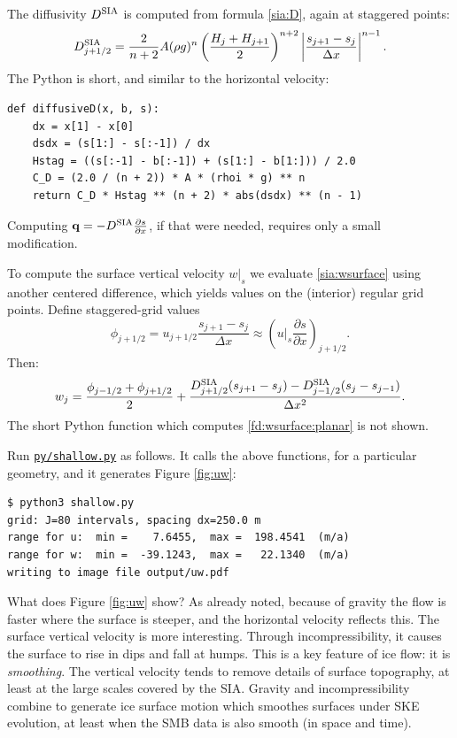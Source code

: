 \documentclass[letterpaper,final,12pt,reqno]{amsart}
\newcommand{\bq}{\mathbf{q}}
\newcommand{\Dsia}{D^{\text{\textrm{SIA}}}}
\begin{document}
The diffusivity $\Dsia$ is computed from formula \eqref{sia:D}, again at staggered points:
\begin{equation}
\Dsia_{j+1/2} = \frac{2}{n+2} A (\rho g)^n \left(\frac{H_j + H_{j+1}}{2}\right)^{n+2} \left|\frac{s_{j+1}-s_j}{\Delta x}\right|^{n-1}. \label{fd:Dsia:planar}
\end{equation}
The Python is short, and similar to the horizontal velocity:
\begin{lstlisting}[language=PythonPlus, xleftmargin=4mm]
def diffusiveD(x, b, s):
    dx = x[1] - x[0]
    dsdx = (s[1:] - s[:-1]) / dx
    Hstag = ((s[:-1] - b[:-1]) + (s[1:] - b[1:])) / 2.0
    C_D = (2.0 / (n + 2)) * A * (rhoi * g) ** n
    return C_D * Hstag ** (n + 2) * abs(dsdx) ** (n - 1)
\end{lstlisting}
Computing $\bq=-\Dsia \frac{\partial s}{\partial x}$, if that were needed, requires only a small modification.

To compute the surface vertical velocity $w|_s$ we evaluate \eqref{sia:wsurface} using another centered difference, which yields values on the (interior) regular grid points.  Define staggered-grid values
	$$\phi_{j+1/2} = u_{j+1/2} \frac{s_{j+1}-s_j}{\Delta x} \approx \left(u|_s \frac{\partial s}{\partial x}\right)_{j+1/2}.$$
Then:
\begin{equation}
w_j = \frac{\phi_{j-1/2} + \phi_{j+1/2}}{2} + \frac{\Dsia_{j+1/2} (s_{j+1}-s_j) - \Dsia_{j-1/2} (s_{j}-s_{j-1})}{\Delta x^2}. \label{fd:wsurface:planar}
\end{equation}
The short Python function which computes \eqref{fd:wsurface:planar} is not shown.

Run \href{https://github.com/bueler/mccarthy/blob/master/py/shallow.py}{\texttt{py/shallow.py}} as follows.  It calls the above functions, for a particular geometry, and it generates Figure \ref{fig:uw}:

\smallskip
\begin{Verbatim}[xleftmargin=4mm]
$ python3 shallow.py 
grid: J=80 intervals, spacing dx=250.0 m
range for u:  min =    7.6455,  max =  198.4541  (m/a)
range for w:  min =  -39.1243,  max =   22.1340  (m/a)
writing to image file output/uw.pdf
\end{Verbatim}

\medskip
What does Figure \ref{fig:uw} show?  As already noted, because of gravity the flow is faster where the surface is steeper, and the horizontal velocity reflects this.  The surface vertical velocity is more interesting.  Through incompressibility, it causes the surface to rise in dips and fall at humps.  This is a key feature of ice flow: it is \emph{smoothing}.  The vertical velocity tends to remove details of surface topography, at least at the large scales covered by the SIA.  Gravity and incompressibility combine to generate ice surface motion which smoothes surfaces under SKE evolution, at least when the SMB data is also smooth (in space and time).
\end{document}

